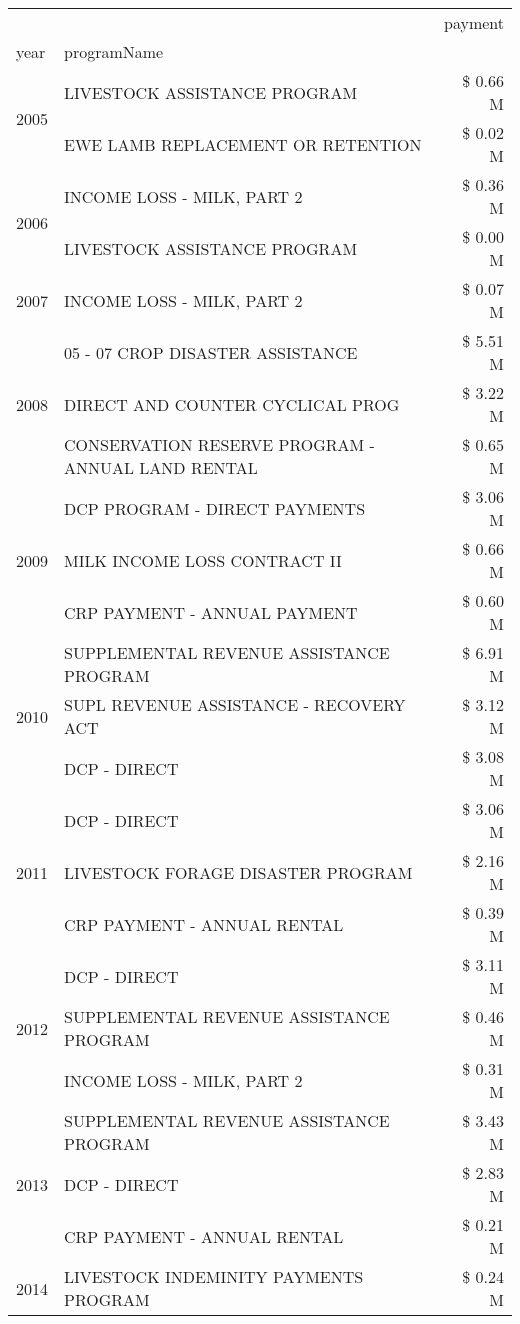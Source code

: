 \begin{tabular}{llr}
\toprule
 &  & payment \\
year & programName &  \\
\midrule
\multirow[t]{2}{*}{2005} & LIVESTOCK ASSISTANCE PROGRAM & \$ 0.66 M \\
 & EWE LAMB REPLACEMENT OR RETENTION & \$ 0.02 M \\
\cline{1-3}
\multirow[t]{2}{*}{2006} & INCOME LOSS - MILK, PART 2 & \$ 0.36 M \\
 & LIVESTOCK ASSISTANCE PROGRAM & \$ 0.00 M \\
\cline{1-3}
2007 & INCOME LOSS - MILK, PART 2 & \$ 0.07 M \\
\cline{1-3}
\multirow[t]{3}{*}{2008} & 05 - 07 CROP DISASTER ASSISTANCE & \$ 5.51 M \\
 & DIRECT AND COUNTER CYCLICAL PROG & \$ 3.22 M \\
 & CONSERVATION RESERVE PROGRAM - ANNUAL LAND RENTAL & \$ 0.65 M \\
\cline{1-3}
\multirow[t]{3}{*}{2009} & DCP PROGRAM - DIRECT PAYMENTS & \$ 3.06 M \\
 & MILK INCOME LOSS CONTRACT II & \$ 0.66 M \\
 & CRP PAYMENT - ANNUAL PAYMENT & \$ 0.60 M \\
\cline{1-3}
\multirow[t]{3}{*}{2010} & SUPPLEMENTAL REVENUE ASSISTANCE PROGRAM & \$ 6.91 M \\
 & SUPL REVENUE ASSISTANCE - RECOVERY ACT & \$ 3.12 M \\
 & DCP - DIRECT & \$ 3.08 M \\
\cline{1-3}
\multirow[t]{3}{*}{2011} & DCP - DIRECT & \$ 3.06 M \\
 & LIVESTOCK FORAGE DISASTER PROGRAM & \$ 2.16 M \\
 & CRP PAYMENT - ANNUAL RENTAL & \$ 0.39 M \\
\cline{1-3}
\multirow[t]{3}{*}{2012} & DCP - DIRECT & \$ 3.11 M \\
 & SUPPLEMENTAL REVENUE ASSISTANCE PROGRAM & \$ 0.46 M \\
 & INCOME LOSS - MILK, PART 2 & \$ 0.31 M \\
\cline{1-3}
\multirow[t]{3}{*}{2013} & SUPPLEMENTAL REVENUE ASSISTANCE PROGRAM & \$ 3.43 M \\
 & DCP - DIRECT & \$ 2.83 M \\
 & CRP PAYMENT - ANNUAL RENTAL & \$ 0.21 M \\
\cline{1-3}
\multirow[t]{3}{*}{2014} & LIVESTOCK INDEMINITY PAYMENTS PROGRAM & \$ 0.24 M \\

\end{tabular}
